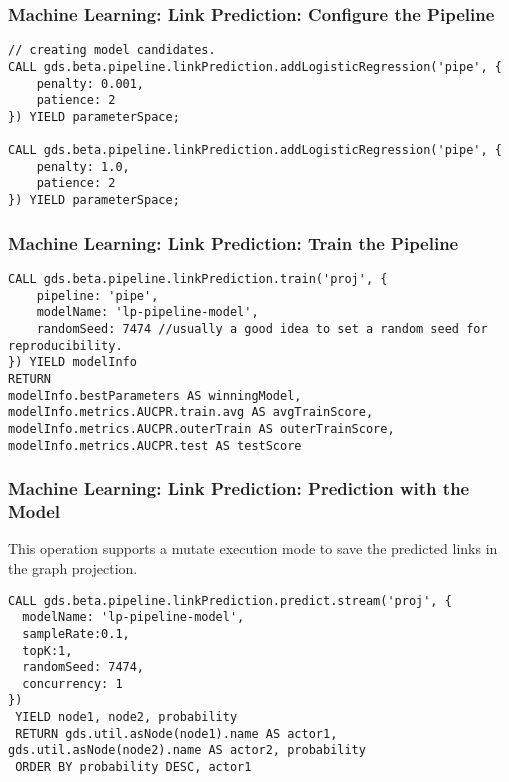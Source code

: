 \begin{frame}[fragile]\frametitle{Machine Learning: Link Prediction: Configure the Pipeline}

\begin{lstlisting}
// creating model candidates. 
CALL gds.beta.pipeline.linkPrediction.addLogisticRegression('pipe', {
    penalty: 0.001,
    patience: 2
}) YIELD parameterSpace;

CALL gds.beta.pipeline.linkPrediction.addLogisticRegression('pipe', {
    penalty: 1.0,
    patience: 2
}) YIELD parameterSpace;
\end{lstlisting}

\end{frame}

\begin{frame}[fragile]\frametitle{Machine Learning: Link Prediction: Train the Pipeline}

\begin{lstlisting}
CALL gds.beta.pipeline.linkPrediction.train('proj', {
    pipeline: 'pipe',
    modelName: 'lp-pipeline-model',
    randomSeed: 7474 //usually a good idea to set a random seed for reproducibility.
}) YIELD modelInfo
RETURN
modelInfo.bestParameters AS winningModel,
modelInfo.metrics.AUCPR.train.avg AS avgTrainScore,
modelInfo.metrics.AUCPR.outerTrain AS outerTrainScore,
modelInfo.metrics.AUCPR.test AS testScore
\end{lstlisting}

\end{frame}

\begin{frame}[fragile]\frametitle{Machine Learning: Link Prediction: Prediction with the Model}
This operation supports a mutate execution mode to save the predicted links in the graph projection.


\begin{lstlisting}
CALL gds.beta.pipeline.linkPrediction.predict.stream('proj', {
  modelName: 'lp-pipeline-model',
  sampleRate:0.1,
  topK:1,
  randomSeed: 7474,
  concurrency: 1
})
 YIELD node1, node2, probability
 RETURN gds.util.asNode(node1).name AS actor1, gds.util.asNode(node2).name AS actor2, probability
 ORDER BY probability DESC, actor1
\end{lstlisting}


\end{frame}